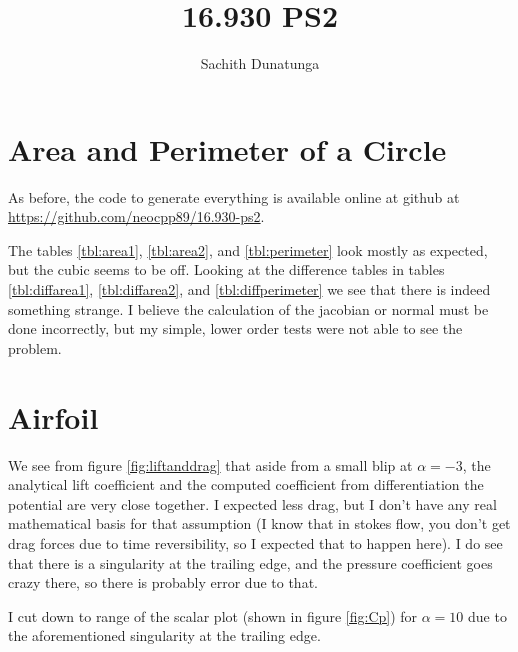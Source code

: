 \documentclass{article}
\begin{document}
\author{Sachith Dunatunga}
\title{16.930 PS2}
\maketitle

\section{Area and Perimeter of a Circle}
As before, the code to generate everything is available online at github at \url{https://github.com/neocpp89/16.930-ps2}.

The tables \ref{tbl:area1}, \ref{tbl:area2}, and \ref{tbl:perimeter} look mostly as expected, but the cubic seems to be off.
Looking at the difference tables in tables \ref{tbl:diffarea1}, \ref{tbl:diffarea2}, and \ref{tbl:diffperimeter} we see that there is indeed something strange.
I believe the calculation of the jacobian or normal must be done incorrectly, but my simple, lower order tests were not able to see the problem.



\section{Airfoil}
We see from figure \ref{fig:liftanddrag} that aside from a small blip at $\alpha = -3$, the analytical lift coefficient and the computed coefficient from differentiation the potential are very close together.
I expected less drag, but I don't have any real mathematical basis for that assumption (I know that in stokes flow, you don't get drag forces due to time reversibility, so I expected that to happen here).
I do see that there is a singularity at the trailing edge, and the pressure coefficient goes crazy there, so there is probably error due to that.

I cut down to range of the scalar plot (shown in figure \ref{fig:Cp}) for $\alpha = 10$ due to the aforementioned singularity at the trailing edge.
\end{document}
